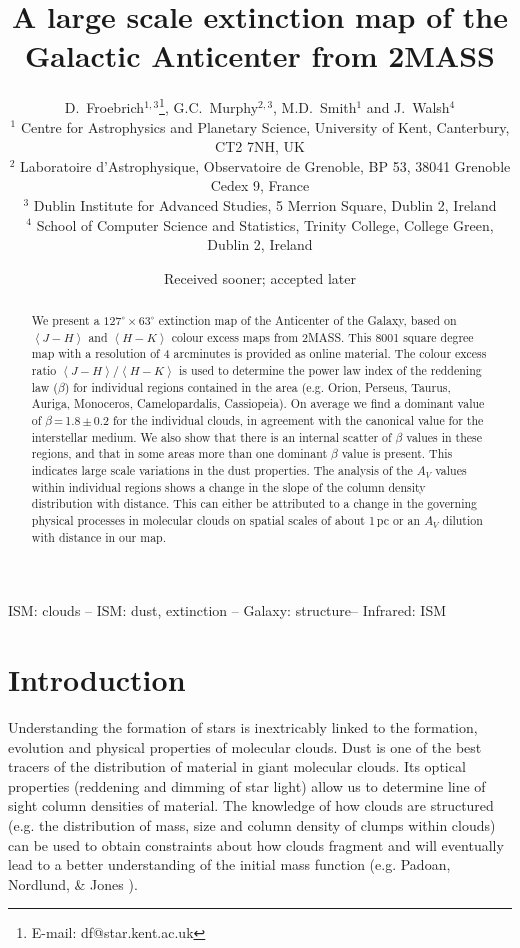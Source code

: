 \documentclass[useAMS,usenatbib]{mn2e}
\title{A large scale extinction map of the Galactic Anticenter from 2MASS}
\author[Froebrich, Murphy, Smith \& Walsh]{D.~Froebrich$^{1,3}$\thanks{E-mail:
df@star.kent.ac.uk}, G.C.~Murphy$^{2,3}$, M.D.~Smith$^{1}$ and J.~Walsh$^{4}$\\
$^1$ Centre for Astrophysics and Planetary Science, University of Kent,
Canterbury, CT2 7NH, UK \\ $^2$ Laboratoire d'Astrophysique, Observatoire de
Grenoble, BP 53, 38041 Grenoble Cedex 9, France \\ $^3$ Dublin Institute for
Advanced Studies, 5 Merrion Square, Dublin 2, Ireland \\ $^4$ School of Computer
Science and Statistics, Trinity College, College Green, Dublin 2, Ireland}
\begin{document}
\date{Received sooner; accepted later}
\pagerange{\pageref{firstpage}--\pageref{lastpage}} 
\maketitle

\label{firstpage}

\begin{abstract}

We present a $127^\circ \times 63^\circ$ extinction map of the Anticenter of the
Galaxy, based on $\left< J-H \right>$ and $\left< H-K \right>$ colour excess
maps from 2MASS. This 8001 square degree map with a resolution of 4 arcminutes
is provided as online material. The colour excess ratio $\left< J-H \right> /
\left< H-K \right>$ is used to determine the power law index of the reddening
law ($\beta$) for individual regions contained in the area (e.g. Orion, Perseus,
Taurus, Auriga, Monoceros, Camelopardalis, Cassiopeia). On average we find a
dominant value of $\beta$\,=\,1.8\,$\pm$\,0.2 for the individual clouds, in
agreement with the canonical value for the interstellar medium. We also show
that there is an internal scatter of $\beta$ values in these regions, and that
in some areas more than one dominant $\beta$ value is present. This indicates
large scale variations in the dust properties. The analysis of the $A_V$
values within individual regions shows a change in the slope of the column
density distribution with distance. This can either be attributed to a change in
the governing physical processes in molecular clouds on spatial scales of about
1\,pc or an $A_V$ dilution with distance in our map.

\end{abstract}

\begin{keywords}
ISM: clouds -- ISM: dust, extinction -- Galaxy: structure-- Infrared: ISM 
\end{keywords}

\section{Introduction}

Understanding the formation of stars is inextricably linked to the formation,
evolution and physical properties of molecular clouds. Dust is one of the best
tracers of the distribution of material in giant molecular clouds. Its
optical properties (reddening and dimming of star light) allow us to determine
line of sight column densities of material. The knowledge of how clouds are
structured (e.g. the distribution of mass, size and column density of clumps
within clouds) can be used to obtain constraints about how clouds fragment and
will eventually lead to a better understanding of the initial mass function
(e.g. Padoan, Nordlund, \& Jones \cite{1997MNRAS.288..145P}). 
\end{document}
